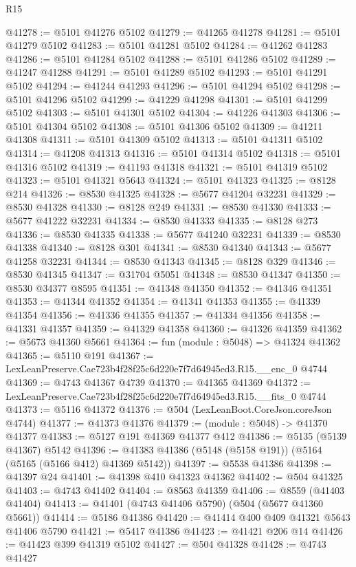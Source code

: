 \begin{lexlean}{R15}
\begin{coremodule}
{{{{{{{{{{{@41278 := @5101 @41276 @5102
@41279 := @41265 @41278
@41281 := @5101 @41279 @5102
@41283 := @5101 @41281 @5102
@41284 := @41262 @41283
@41286 := @5101 @41284 @5102
@41288 := @5101 @41286 @5102
@41289 := @41247 @41288
@41291 := @5101 @41289 @5102
@41293 := @5101 @41291 @5102
@41294 := @41244 @41293
@41296 := @5101 @41294 @5102
@41298 := @5101 @41296 @5102
@41299 := @41229 @41298
@41301 := @5101 @41299 @5102
@41303 := @5101 @41301 @5102
@41304 := @41226 @41303
@41306 := @5101 @41304 @5102
@41308 := @5101 @41306 @5102
@41309 := @41211 @41308
@41311 := @5101 @41309 @5102
@41313 := @5101 @41311 @5102
@41314 := @41208 @41313
@41316 := @5101 @41314 @5102
@41318 := @5101 @41316 @5102
@41319 := @41193 @41318
@41321 := @5101 @41319 @5102
@41323 := @5101 @41321 @5643
@41324 := @5101 @41323
@41325 := @8128 @214
@41326 := @8530 @41325
@41328 := @5677 @41204 @32231
@41329 := @8530 @41328
@41330 := @8128 @249
@41331 := @8530 @41330
@41333 := @5677 @41222 @32231
@41334 := @8530 @41333
@41335 := @8128 @273
@41336 := @8530 @41335
@41338 := @5677 @41240 @32231
@41339 := @8530 @41338
@41340 := @8128 @301
@41341 := @8530 @41340
@41343 := @5677 @41258 @32231
@41344 := @8530 @41343
@41345 := @8128 @329
@41346 := @8530 @41345
@41347 := @31704 @5051
@41348 := @8530 @41347
@41350 := @8530 @34377 @8595
@41351 := @41348 @41350
@41352 := @41346 @41351
@41353 := @41344 @41352
@41354 := @41341 @41353
@41355 := @41339 @41354
@41356 := @41336 @41355
@41357 := @41334 @41356
@41358 := @41331 @41357
@41359 := @41329 @41358
@41360 := @41326 @41359
@41362 := @5673 @41360 @5661
@41364 := fun (module : @5048) => @41324 @41362
@41365 := @5110 @191
@41367 := LexLeanPreserve.Cae723b4f28f25c6d220e7f7d64945ed3.R15.__enc_0 @4744
@41369 := @4743 @41367 @4739
@41370 := @41365 @41369
@41372 := LexLeanPreserve.Cae723b4f28f25c6d220e7f7d64945ed3.R15.__fits_0 @4744
@41373 := @5116 @41372
@41376 := @504 (LexLeanBoot.CoreJson.coreJson @4744)
@41377 := @41373 @41376
@41379 := (module : @5048) -> @41370 @41377
@41383 := @5127 @191 @41369 @41377 @412
@41386 := @5135 (@5139 @41367) @5142
@41396 := @41383 @41386 (@5148 (@5158 @191)) (@5164 (@5165 (@5166 @412) @41369 @5142))
@41397 := @5538 @41386
@41398 := @41397 @24
@41401 := @41398 @410 @41323 @41362
@41402 := @504 @41325
@41403 := @4743 @41402
@41404 := @8563 @41359
@41406 := @8559 (@41403 @41404)
@41413 := @41401 (@4743 @41406 @5790) (@504 (@5677 @41360 @5661))
@41414 := @5186 @41386
@41420 := @41414 @400 @409 @41321 @5643 @41406 @5790
@41421 := @5417 @41386
@41423 := @41421 @206 @14
@41426 := @41423 @399 @41319 @5102
@41427 := @504 @41328
@41428 := @4743 @41427
}}}}}}}}}}}
\end{coremodule}
\end{lexlean}
